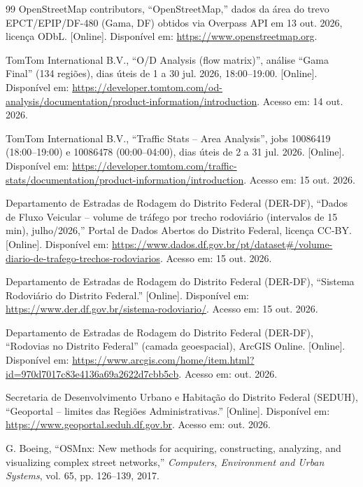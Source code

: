 \begin{thebibliography}{99}
 OpenStreetMap contributors, ``OpenStreetMap,'' dados da área do trevo EPCT/EPIP/DF-480 (Gama, DF) obtidos via Overpass API em 13 out. 2026, licença ODbL. [Online]. Disponível em: \url{https://www.openstreetmap.org}.

 TomTom International B.V., ``O/D Analysis (flow matrix)'', análise ``Gama Final'' (134 regiões), dias úteis de 1 a 30 jul. 2026, 18:00--19:00. [Online]. Disponível em: \url{https://developer.tomtom.com/od-analysis/documentation/product-information/introduction}. Acesso em: 14 out. 2026.

 TomTom International B.V., ``Traffic Stats -- Area Analysis'', jobs 10086419 (18:00--19:00) e 10086478 (00:00--04:00), dias úteis de 2 a 31 jul. 2026. [Online]. Disponível em: \url{https://developer.tomtom.com/traffic-stats/documentation/product-information/introduction}. Acesso em: 15 out. 2026.

 Departamento de Estradas de Rodagem do Distrito Federal (DER-DF), ``Dados de Fluxo Veicular -- volume de tráfego por trecho rodoviário (intervalos de 15 min), julho/2026,'' Portal de Dados Abertos do Distrito Federal, licença CC-BY. [Online]. Disponível em: \url{https://www.dados.df.gov.br/pt/dataset#/volume-diario-de-trafego-trechos-rodoviarios}. Acesso em: 15 out. 2026.

 Departamento de Estradas de Rodagem do Distrito Federal (DER-DF), ``Sistema Rodoviário do Distrito Federal.'' [Online]. Disponível em: \url{https://www.der.df.gov.br/sistema-rodoviario/}. Acesso em: 15 out. 2026.

 Departamento de Estradas de Rodagem do Distrito Federal (DER-DF), ``Rodovias no Distrito Federal'' (camada geoespacial), ArcGIS Online. [Online]. Disponível em: \url{https://www.arcgis.com/home/item.html?id=970d7017c83e4136a69a2622d7cbb5cb}. Acesso em: out. 2026.

 Secretaria de Desenvolvimento Urbano e Habitação do Distrito Federal (SEDUH), ``Geoportal -- limites das Regiões Administrativas.'' [Online]. Disponível em: \url{https://www.geoportal.seduh.df.gov.br}. Acesso em: out. 2026.

 G. Boeing, ``OSMnx: New methods for acquiring, constructing, analyzing, and visualizing complex street networks,'' \textit{Computers, Environment and Urban Systems}, vol. 65, pp. 126--139, 2017.


\end{thebibliography}
